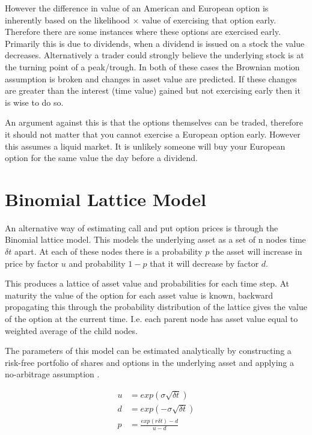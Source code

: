 \documentclass{sig-alternate-05-2015}
\begin{document}
However the difference in value of an American and European option is inherently based on the likelihood $\times$ value of exercising that option early. Therefore  there are some instances where these options are exercised early. Primarily this is due to dividends, when a dividend is issued on a stock the value decreases. Alternatively a trader could strongly believe the underlying stock is at the turning point of a peak/trough. In both of these cases the Brownian motion assumption is broken and changes in asset value are predicted. If these changes are greater than the interest (time value) gained but not exercising early then it is wise to do so.

An argument against this is that the options themselves can be traded, therefore it should not matter that you cannot exercise a European option early. However this assumes a liquid market. It is unlikely someone will buy your European option for the same value the day before a dividend. 

\section{Binomial Lattice Model}
An alternative way of estimating call and put option prices is through the Binomial lattice model. This models the underlying asset as a set of n nodes time $\delta t$ apart. At each of these nodes there is a probability $p$ the asset will increase in price by factor $u$ and probability $1 - p$ that it will decrease by factor $d$. 

This produces a lattice of asset value and probabilities for each time step. At maturity the value of the option for each asset value is known, backward propagating this through the probability distribution of the lattice gives the value of the option at the current time. I.e. each parent node has asset value equal to weighted average of the child nodes. 

The parameters of this model can be estimated analytically by constructing a risk-free portfolio of shares and options in the underlying asset and applying a no-arbitrage assumption \cite{book1}.

\begin{subequations}\label{grp4}
\begin{align}
u &= exp(\sigma\sqrt{\delta t}) \\
d &= exp(-\sigma\sqrt{\delta t}) \\
p &= \frac{exp(r\delta t) - d}{u - d}
\end{align}
\end{subequations}
\end{document}
